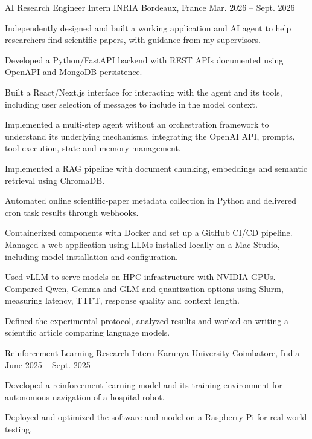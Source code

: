 
\begin{cventries}
  \cventry
    {AI Research Engineer Intern}
    {INRIA}
    {Bordeaux, France}
    {Mar. 2026 -- Sept. 2026}
    {
      \begin{cvitems}
        \item {Independently designed and built a working application and AI agent to help researchers find scientific papers, with guidance from my supervisors.}
        \item {Developed a Python/FastAPI backend with REST APIs documented using OpenAPI and MongoDB persistence.}
        \item {Built a React/Next.js interface for interacting with the agent and its tools, including user selection of messages to include in the model context.}
        \item {Implemented a multi-step agent without an orchestration framework to understand its underlying mechanisms, integrating the OpenAI API, prompts, tool execution, state and memory management.}
        \item {Implemented a RAG pipeline with document chunking, embeddings and semantic retrieval using ChromaDB.}
        \item {Automated online scientific-paper metadata collection in Python and delivered cron task results through webhooks.}
        \item {Containerized components with Docker and set up a GitHub CI/CD pipeline. Managed a web application using LLMs installed locally on a Mac Studio, including model installation and configuration.}
        \item {Used vLLM to serve models on HPC infrastructure with NVIDIA GPUs. Compared Qwen, Gemma and GLM and quantization options using Slurm, measuring latency, TTFT, response quality and context length.}
        \item {Defined the experimental protocol, analyzed results and worked on writing a scientific article comparing language models.}
      \end{cvitems}
    }

  \cventry
    {Reinforcement Learning Research Intern}
    {Karunya University}
    {Coimbatore, India}
    {June 2025 -- Sept. 2025}
    {
      \begin{cvitems}
        \item {Developed a reinforcement learning model and its training environment for autonomous navigation of a hospital robot.}
        \item {Deployed and optimized the software and model on a Raspberry Pi for real-world testing.}
      \end{cvitems}
    }
\end{cventries}

